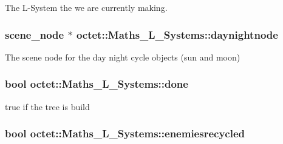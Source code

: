 The L-\/\+System the we are currently making. 

\hypertarget{classoctet_1_1_maths___l___systems_afdbae311939cba356a0d6fc5c39d1a66}{
\subsubsection[{daynightnode}]{\setlength{\rightskip}{0pt plus 5cm}scene\+\_\+node $\ast$ octet\+::\+Maths\+\_\+\+L\+\_\+\+Systems\+::daynightnode\hspace{0.3cm}{\ttfamily [private]}}}\label{classoctet_1_1_maths___l___systems_afdbae311939cba356a0d6fc5c39d1a66}


The scene node for the day night cycle objects (sun and moon) 

\hypertarget{classoctet_1_1_maths___l___systems_ab9e326a382610ba6088d52a966ec4d9e}{
\subsubsection[{done}]{\setlength{\rightskip}{0pt plus 5cm}bool octet\+::\+Maths\+\_\+\+L\+\_\+\+Systems\+::done\hspace{0.3cm}{\ttfamily [private]}}}\label{classoctet_1_1_maths___l___systems_ab9e326a382610ba6088d52a966ec4d9e}


true if the tree is build 

\hypertarget{classoctet_1_1_maths___l___systems_a247062240824f418a425518fdc0d7e58}{
\subsubsection[{enemiesrecycled}]{\setlength{\rightskip}{0pt plus 5cm}bool octet\+::\+Maths\+\_\+\+L\+\_\+\+Systems\+::enemiesrecycled\hspace{0.3cm}{\ttfamily [private]}}}\label{classoctet_1_1_maths___l___systems_a247062240824f418a425518fdc0d7e58}


